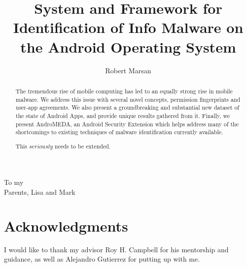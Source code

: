 \documentclass[edeposit,10pt,fullpage]{uiucthesis2009}
\begin{document}
\title{System and Framework for Identification of Info Malware on the Android Operating System}
\author{Robert Marsan}
\msthesis
{}
\maketitle

\frontmatter

\begin{abstract}
The tremendous rise of mobile computing has led to an equally strong rise in mobile malware. We address this issue with several novel concepts, permission fingerprints and user-app agreements. We also present a groundbreaking and substantial new dataset of the state of Android Apps, and provide unique results gathered from it. Finally, we present AndroMEDA, an Android Security Extension which helps address many of the shortcomings to existing techniques of malware identification currently available.


This $seriously$ needs to be extended.

\end{abstract}

\begin{dedication}
To my\\
Parents, Lisa and Mark
\end{dedication}

\chapter*{Acknowledgments}

I would like to thank my advisor Roy H. Campbell for his mentorship and guidance, as well as Alejandro Gutierrez for putting up with me.

\end{document}
